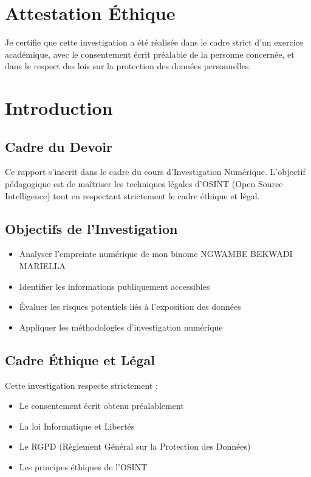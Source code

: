 \documentclass[12pt, a4paper]{article}
\begin{document}
\section*{Attestation Éthique}
Je certifie que cette investigation a été réalisée dans le cadre strict d'un exercice académique, avec le consentement écrit préalable de la personne concernée, et dans le respect des lois sur la protection des données personnelles.

\vspace{1cm}


\tableofcontents
\newpage

\section{Introduction}
\subsection{Cadre du Devoir}
Ce rapport s'inscrit dans le cadre du cours d'Investigation Numérique. L'objectif pédagogique est de maîtriser les techniques légales d'OSINT (Open Source Intelligence) tout en respectant strictement le cadre éthique et légal.

\subsection{Objectifs de l'Investigation}
\begin{itemize}
    \item Analyser l'empreinte numérique de mon binome NGWAMBE BEKWADI MARIELLA
    \item Identifier les informations publiquement accessibles
    \item Évaluer les risques potentiels liés à l'exposition des données
    \item Appliquer les méthodologies d'investigation numérique 
\end{itemize}

\subsection{Cadre Éthique et Légal}
Cette investigation respecte strictement :
\begin{itemize}
    \item Le consentement écrit obtenu préalablement
    \item La loi Informatique et Libertés
    \item Le RGPD (Règlement Général sur la Protection des Données)
    \item Les principes éthiques de l'OSINT
\end{itemize}
\end{document}
